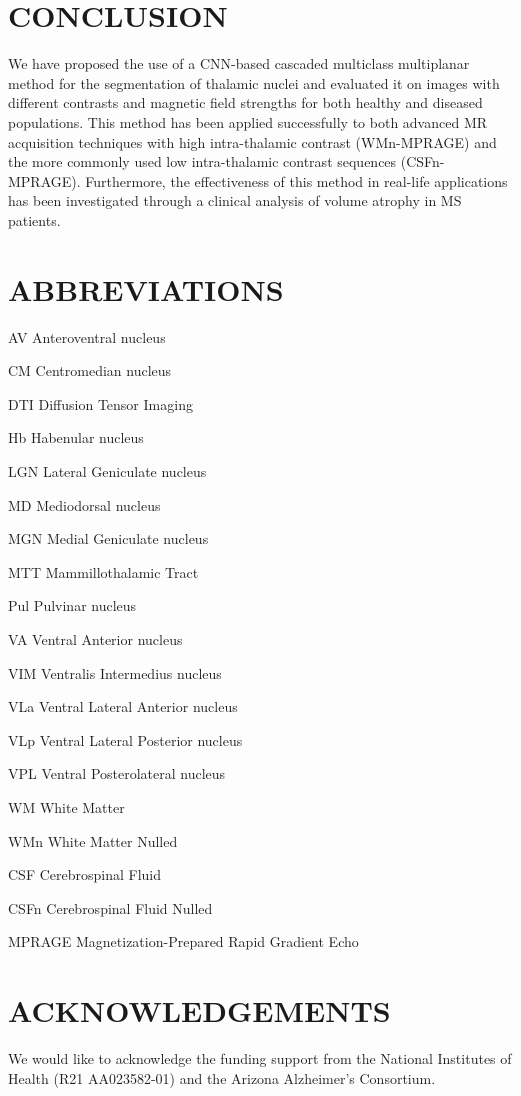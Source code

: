 \documentclass[3p,,final,12pt]{elsarticle}
\begin{document}
\section{CONCLUSION}
We have proposed the use of a CNN-based cascaded multiclass multiplanar method for the segmentation of thalamic nuclei and evaluated it on images with different contrasts and magnetic field strengths for both healthy and diseased populations. This method has been applied successfully to both advanced MR acquisition techniques with high intra-thalamic contrast (WMn-MPRAGE) and the more commonly used low intra-thalamic contrast sequences (CSFn-MPRAGE). Furthermore, the effectiveness of this method in real-life applications has been investigated through a clinical analysis of volume atrophy in MS patients. 
    
\section{ABBREVIATIONS}
AV Anteroventral nucleus

CM Centromedian nucleus 

DTI Diffusion Tensor Imaging 

Hb Habenular nucleus 

LGN Lateral Geniculate nucleus 

MD Mediodorsal nucleus 

MGN Medial Geniculate nucleus 

MTT Mammillothalamic Tract 

Pul Pulvinar nucleus 

VA Ventral Anterior nucleus 

VIM Ventralis Intermedius nucleus 

VLa Ventral Lateral Anterior nucleus 

VLp Ventral Lateral Posterior nucleus 

VPL Ventral Posterolateral nucleus 

WM White Matter 

WMn White Matter Nulled

CSF Cerebrospinal Fluid 

CSFn Cerebrospinal Fluid Nulled 

MPRAGE Magnetization-Prepared Rapid Gradient Echo 


\section{ACKNOWLEDGEMENTS} We would like to acknowledge the funding support from the National Institutes of Health (R21 AA023582-01) and the Arizona Alzheimer's Consortium. 





\end{document}
